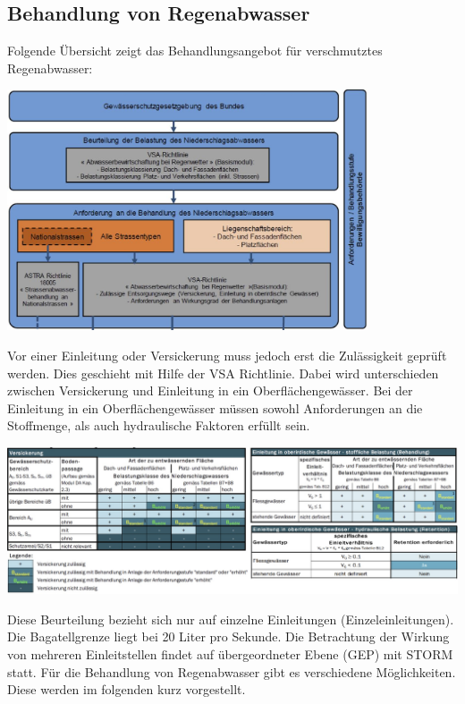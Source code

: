 \documentclass[9pt, openright=false]{scrartcl}
\begin{document}
\subsection{Behandlung von Regenabwasser} 
Folgende Übersicht zeigt das Behandlungsangebot für verschmutztes Regenabwasser:
\begin{center}
\includegraphics[width=0.8\textwidth]{images/behandlungsangebot}
\end{center}\par
Vor einer Einleitung oder Versickerung muss jedoch erst die Zulässigkeit geprüft werden. Dies geschieht mit Hilfe der VSA Richtlinie. Dabei wird unterschieden zwischen Versickerung und Einleitung in ein Oberflächengewässer. Bei der Einleitung in ein Oberflächengewässer müssen sowohl Anforderungen an die Stoffmenge, als auch hydraulische Faktoren erfüllt sein.
\begin{center}
\includegraphics[width=\textwidth]{images/zulaessigkeit}
\end{center}\par
Diese Beurteilung bezieht sich nur auf einzelne Einleitungen (Einzeleinleitungen). Die Bagatellgrenze liegt bei 20 Liter pro Sekunde. Die Betrachtung der Wirkung von mehreren Einleitstellen findet auf übergeordneter Ebene (GEP) mit STORM statt. Für die Behandlung von Regenabwasser gibt es verschiedene Möglichkeiten. Diese werden im folgenden kurz vorgestellt. \clearpage
\end{document}
